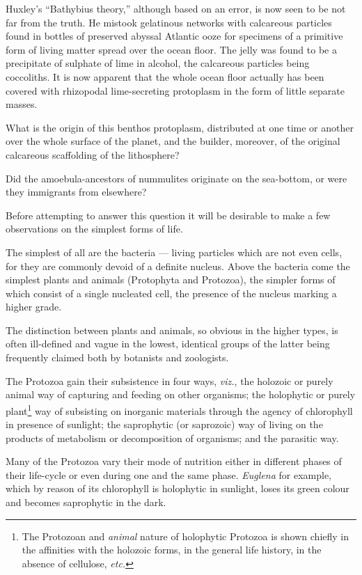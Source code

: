 \documentclass[a4paper, 12pt, oneside]{article}
\begin{document}
Huxley's ``Bathybius theory,'' although based on an error, is now seen to be not far from the truth. He mistook gelatinous networks with calcareous particles found in bottles of preserved abyssal Atlantic ooze for specimens of a primitive form of living matter spread over the ocean floor. The jelly was found to be a precipitate of sulphate of lime in alcohol, the calcareous particles being coccoliths. It is now apparent that the whole ocean floor actually has been covered with rhizopodal lime-secreting protoplasm in the form of little separate masses.

What is the origin of this benthos protoplasm, distributed at one time or another over the whole surface of the planet, and the builder, moreover, of the original calcareous scaffolding of the lithosphere?

Did the amoebula-ancestors of nummulites originate on the sea-bottom, or were they immigrants from elsewhere?

Before attempting to answer this question it will be desirable to make a few observations on the simplest forms of life.

The simplest of all are the bacteria --- living particles which are not even cells, for they are commonly devoid of a definite nucleus. Above the bacteria come the simplest plants and animals (Protophyta and Protozoa), the simpler forms of which consist of a single nucleated cell, the presence of the nucleus marking a higher grade.

The distinction between plants and animals, so obvious in the higher types, is often ill-defined and vague in the lowest, identical groups of the latter being frequently claimed both by botanists and zoologists.

The Protozoa gain their subsistence in four ways, \emph{viz.}, the holozoic or purely animal way of capturing and feeding on other organisms; the holophytic or purely plant\footnote{The Protozoan and \emph{animal} nature of holophytic Protozoa is shown chiefly in the affinities with the holozoic forms, in the general life history, in the absence of cellulose, \emph{etc.}} way of subsisting on inorganic materials through the agency of chlorophyll in presence of sunlight; the saprophytic (or saprozoic) way of living on the products of metabolism or decomposition of organisms; and the parasitic way.

Many of the Protozoa vary their mode of nutrition either in different phases of their life-cycle or even during one and the same phase. \emph{Euglena} for example, which by reason of its chlorophyll is holophytic in sunlight, loses its green colour and becomes saprophytic in the dark.
\end{document}
